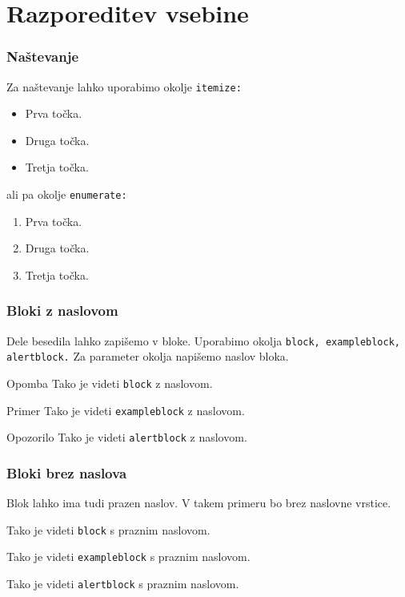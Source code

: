 \documentclass{beamer}
\begin{document}
\section{Razporeditev vsebine}
\begin{frame}
\frametitle{Naštevanje}
Za naštevanje lahko uporabimo okolje \texttt{itemize:}
\begin{itemize}
\item
      Prva točka.
      \item
      Druga točka.
      \item
      Tretja točka.
\end{itemize}
   ali pa okolje \texttt{enumerate:}
\begin{enumerate}
\item
      Prva točka.
      \item
      Druga točka.
      \item
      Tretja točka.
      \end{enumerate}
\end{frame}

\begin{frame}
   \frametitle{Bloki z naslovom}
   Dele besedila lahko zapišemo v bloke.
   Uporabimo okolja \texttt{block, exampleblock, alertblock.}
   Za parameter okolja napišemo naslov bloka.
\begin{block}{Opomba}
      Tako je videti \texttt{block} z naslovom.
\end{block}
\begin{exampleblock}{Primer}
      Tako je videti \texttt{exampleblock} z naslovom.
\end{exampleblock}
\begin{alertblock}{Opozorilo}
      Tako je videti \texttt{alertblock} z naslovom.
\end{alertblock}
\end{frame}

\begin{frame}
\frametitle{Bloki brez naslova}
   Blok lahko ima tudi prazen naslov.
   V takem primeru bo brez naslovne vrstice.
   \begin{block}{}
      Tako je videti \texttt{block} s praznim naslovom.
      \end{block}
      \begin{exampleblock}{}
      Tako je videti \texttt{exampleblock} s praznim naslovom.
      \end{exampleblock}
      \begin{alertblock}{}
      Tako je videti \texttt{alertblock} s praznim naslovom.
      \end{alertblock}
\end{frame}
\end{document}
